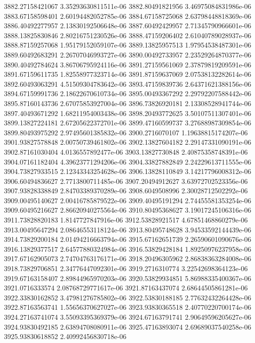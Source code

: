 {3882.27158421067 3.35293630811511e-06
3882.80491821956 3.46975084831986e-06
3883.67158598401 2.60194482052785e-06
3884.67158725068 2.63798448818369e-06
3886.40492277957 2.13830192506648e-06
3887.60492429957 2.71345790966601e-06
3888.13825830846 2.80216751230526e-06
3888.47159206402 2.61040789028937e-06
3888.87159257068 1.95179152059107e-06
3889.13825957513 1.97954538487301e-06
3889.60492683291 2.26707046993727e-06
3890.00492733957 2.23529264870377e-06
3890.40492784624 3.86706795924116e-06
3891.27159561069 2.37879819209591e-06
3891.67159611735 1.82558977323714e-06
3891.87159637069 2.07538132282614e-06
3892.60493063291 4.51509304783642e-06
3893.47159839736 2.64371621388156e-06
3894.67159991736 2.18622670610734e-06
3895.00493367292 2.29792207588442e-06
3895.87160143736 2.67075853927004e-06
3896.73826920181 2.13308528941744e-06
3897.40493671292 1.68211954003438e-06
3898.20493772625 3.50107511307401e-06
3899.13827224181 2.67205622372701e-06
3899.47160599737 3.27688987309854e-06
3899.80493975292 2.97495601385832e-06
3900.2716070107 1.19638815174207e-06
3901.93827578848 2.00750739461802e-06
3902.13827604182 2.29147331090191e-06
3902.87161030404 4.0136557892477e-06
3903.13827730848 2.40875358748391e-06
3904.07161182404 4.39623771294206e-06
3904.33827882849 2.24229613711555e-06
3904.73827933515 2.12343343254628e-06
3906.13828110849 3.14217796008312e-06
3906.60494836627 2.7713800711485e-06
3907.20494912627 3.63972702523356e-06
3907.93828338849 2.84703389370289e-06
3908.6049508996 2.30028712502292e-06
3909.00495140627 2.00416785879522e-06
3909.40495191294 2.74455581353254e-06
3909.60495216627 2.86620940275564e-06
3910.80495368627 3.19017245106316e-06
3911.73828820183 1.8147727847916e-06
3912.53828921517 4.67851468860279e-06
3913.00495647294 2.08646553118124e-06
3913.80495748628 3.94533592144439e-06
3914.73829200184 2.01494216663794e-06
3915.67162651739 2.26590601090676e-06
3916.13829377517 2.64577880324984e-06
3916.53829428184 1.89250976237958e-06
3917.67162905073 2.74704763176171e-06
3918.20496305962 2.86838363284008e-06
3918.73829706851 2.34776447092301e-06
3919.2716310774 3.22542698364123e-06
3919.67163158407 2.89844965970203e-06
3920.53829934851 5.86988335400367e-06
3921.0716333574 2.08768729771617e-06
3921.87163437074 2.68644505861281e-06
3922.33830162852 3.47981276785802e-06
3922.53830188185 2.77632432264428e-06
3922.87163563741 1.55656370627027e-06
3923.93830365518 2.40770220700174e-06
3924.27163741074 3.55093395369379e-06
3924.67163791741 2.90649596205627e-06
3924.93830492185 2.63894708080911e-06
3925.47163893074 2.69689037540258e-06
3925.93830618852 2.40992456830718e-06
}
